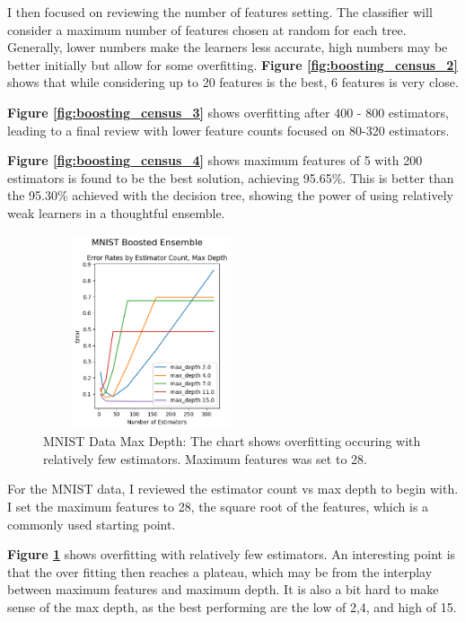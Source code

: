 \documentclass[letterpaper]{article} %
\begin{document}
I then focused on reviewing the number of features setting.  The classifier will consider a maximum number of features chosen at random for each tree.  Generally, lower numbers make the learners less accurate, high numbers may be better initially but allow for some overfitting. \textbf{Figure \ref{fig:boosting_census_2}}  shows that while considering up to 20 features is the best, 6 features is very close.

\textbf{Figure \ref{fig:boosting_census_3}}  shows overfitting after 400 - 800 estimators, leading to a final review with lower feature counts focused on 80-320 estimators.

\textbf{Figure \ref{fig:boosting_census_4}}  shows maximum features of 5 with 200 estimators is found to be the best solution, achieving  95.65\%.  This is better than the 95.30\% achieved with the decision tree, showing the power of using relatively weak learners in a thoughtful ensemble.

\begin{figure}[h]
\centering
\includegraphics[width=2.5in, height=2.25in]{figures/MNIST_Boosted_Ensemble_boosting_1.png}
\caption{MNIST Data Max Depth:  The chart shows overfitting occuring with relatively few estimators.  Maximum features was set to 28.  }
\label{fig:boosting_mnist_1}
\end{figure}

For the MNIST data, I reviewed the estimator count vs max depth to begin with.  I set the maximum features to 28, the square root of the features, which is a commonly used starting point.

\textbf{Figure \ref{fig:boosting_mnist_1}}  shows overfitting with relatively few estimators.  An interesting point is that the over fitting then reaches a plateau, which may be from the interplay between maximum features and maximum depth.  It is also a bit hard to make sense of the max depth, as the best performing are the low of 2,4, and high of 15. 
\end{document}
